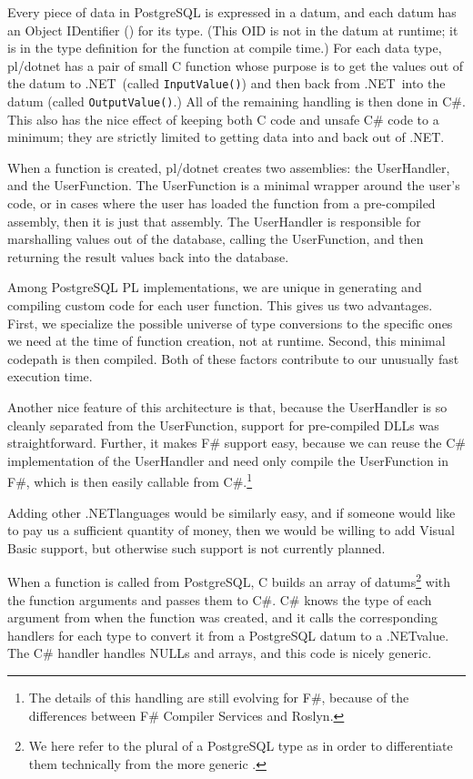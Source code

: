 \documentclass[sigconf,techreport,authorversion,nonacm]{acmart}
\newcommand{\dotnet}{.NET}
\begin{document}
Every piece of data in PostgreSQL is expressed in a datum, and each
datum has an Object IDentifier () for its
type. (This OID is not in the datum at runtime; it is in the type
definition for the function at compile time.) For each data type,
pl/dotnet has a pair of small C function whose purpose is to get
the values out of the datum to \dotnet\ (called \texttt{InputValue()})
and then back from \dotnet\ into the datum (called \texttt{OutputValue()}.)
All of the remaining handling is then done in C\#. This also has
the nice effect of keeping both C code and unsafe C\# code to a
minimum; they are strictly limited to getting data into and back
out of \dotnet.

When a function is created, pl/dotnet creates two assemblies: the
UserHandler, and the UserFunction.  The UserFunction is a minimal
wrapper around the user's code, or in cases where the user has
loaded the function from a pre-compiled assembly, then it is just
that assembly.  The UserHandler is responsible for marshalling
values out of the database, calling the UserFunction, and then
returning the result values back into the database.

Among PostgreSQL PL implementations, we are unique in generating
and compiling custom code for each user function.  This gives us
two advantages.  First, we specialize the possible universe of type
conversions to the specific ones we need at the time of function
creation, not at runtime.  Second, this minimal codepath is then
compiled.  Both of these factors contribute to our unusually fast
execution time.

Another nice feature of this architecture is that, because the
UserHandler is so cleanly separated from the UserFunction, support
for pre-compiled DLLs was straightforward. Further, it makes F\#
support easy, because we can reuse the C\# implementation of the
UserHandler and need only compile the UserFunction in F\#, which
is then easily callable from C\#.\footnote{The details of this
handling are still evolving for F\#, because of the differences
between F\# Compiler Services and Roslyn.}

Adding other \dotnet languages would be similarly easy, and if someone
would like to pay us a sufficient quantity of money, then we would
be willing to add Visual Basic support, but otherwise such support
is not currently planned.

When a function is called from PostgreSQL, C builds an array of
datums\footnote{We here refer to the plural of a PostgreSQL type
 as  in order to differentiate
them technically from the more generic .} with the
function arguments and passes them to C\#. C\# knows the type of
each argument from when the function was created, and it calls the
corresponding handlers for each type to convert it from a PostgreSQL
datum to a \dotnet value.  The C\# handler handles NULLs and arrays,
and this code is nicely generic.
\end{document}
